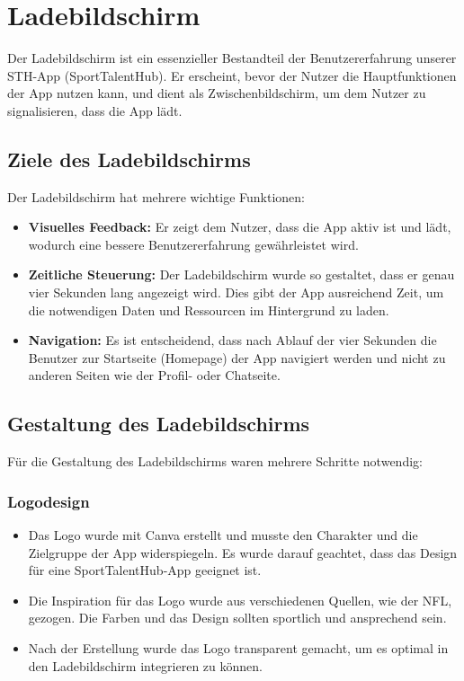 \chapter{Ladebildschirm}

Der Ladebildschirm ist ein essenzieller Bestandteil der Benutzererfahrung unserer STH-App (SportTalentHub). Er erscheint, bevor der Nutzer die Hauptfunktionen der App nutzen kann, und dient als Zwischenbildschirm, um dem Nutzer zu signalisieren, dass die App lädt.

\section{Ziele des Ladebildschirms}

Der Ladebildschirm hat mehrere wichtige Funktionen:

\begin{itemize}
    \item \textbf{Visuelles Feedback:} Er zeigt dem Nutzer, dass die App aktiv ist und lädt, wodurch eine bessere Benutzererfahrung gewährleistet wird.
    \item \textbf{Zeitliche Steuerung:} Der Ladebildschirm wurde so gestaltet, dass er genau vier Sekunden lang angezeigt wird. Dies gibt der App ausreichend Zeit, um die notwendigen Daten und Ressourcen im Hintergrund zu laden.
    \item \textbf{Navigation:} Es ist entscheidend, dass nach Ablauf der vier Sekunden die Benutzer zur Startseite (Homepage) der App navigiert werden und nicht zu anderen Seiten wie der Profil- oder Chatseite.
\end{itemize}

\section{Gestaltung des Ladebildschirms}

Für die Gestaltung des Ladebildschirms waren mehrere Schritte notwendig:

\subsection{Logodesign}

\begin{itemize}
    \item Das Logo wurde mit Canva erstellt und musste den Charakter und die Zielgruppe der App widerspiegeln. Es wurde darauf geachtet, dass das Design für eine SportTalentHub-App geeignet ist.
    \item Die Inspiration für das Logo wurde aus verschiedenen Quellen, wie der NFL, gezogen. Die Farben und das Design sollten sportlich und ansprechend sein.
    \item Nach der Erstellung wurde das Logo transparent gemacht, um es optimal in den Ladebildschirm integrieren zu können.
\end{itemize}


